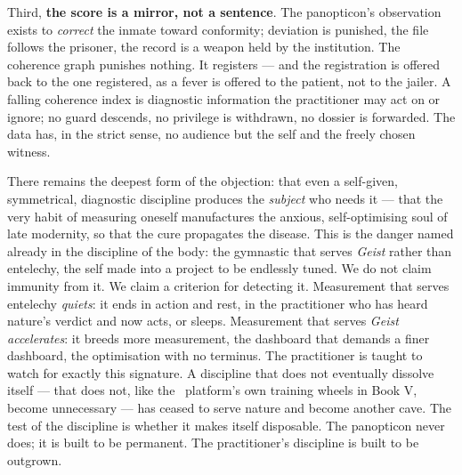 Third, \textbf{the score is a mirror, not a sentence}. The panopticon's
observation exists to \emph{correct} the inmate toward conformity; deviation is
punished, the file follows the prisoner, the record is a weapon held by the
institution. The coherence graph punishes nothing. It registers --- and the
registration is offered back to the one registered, as a fever is offered to the
patient, not to the jailer. A falling coherence index is diagnostic information
the practitioner may act on or ignore; no guard descends, no privilege is
withdrawn, no dossier is forwarded. The data has, in the strict sense, no
audience but the self and the freely chosen witness.

There remains the deepest form of the objection: that even a self-given,
symmetrical, diagnostic discipline produces the \emph{subject} who needs it ---
that the very habit of measuring oneself manufactures the anxious,
self-optimising soul of late modernity, so that the cure propagates the disease.
This is the danger named already in the discipline of the body: the gymnastic
that serves \emph{Geist} rather than entelechy, the self made into a project to be
endlessly tuned. We do not claim immunity from it. We claim a criterion for
detecting it. Measurement that serves entelechy \emph{quiets}: it ends in action
and rest, in the practitioner who has heard nature's verdict and now acts, or
sleeps. Measurement that serves \emph{Geist} \emph{accelerates}: it breeds more
measurement, the dashboard that demands a finer dashboard, the optimisation with
no terminus. The practitioner is taught to watch for exactly this signature. A
discipline that does not eventually dissolve itself --- that does not, like the
\praxis\ platform's own training wheels in Book V, become unnecessary --- has
ceased to serve nature and become another cave. The test of the discipline is
whether it makes itself disposable. The panopticon never does; it is built to be
permanent. The practitioner's discipline is built to be outgrown.

